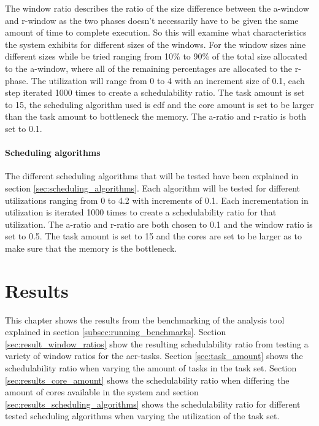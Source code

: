 \documentclass{kththesis}
\begin{document}
The window ratio describes the ratio of the size difference between the \acrshort{a}-window and
\acrshort{r}-window as the two phases doesn't necessarily have to be given the same amount of time
to complete execution. So this will examine what characteristics the system exhibits for different
sizes of the windows. For the window sizes nine different sizes while be tried ranging from 10\% to 90\% of the
total size allocated to the \acrshort{a}-window, where all of the remaining percentages are
allocated to the \acrshort{r}-phase. The utilization will range from 0 to 4 with an increment size
of 0.1, each step iterated 1000 times to create a schedulability ratio. The task amount is set to
15, the scheduling algorithm used is \acrshort{edf} and the core amount is set to be larger than
the task amount to bottleneck the memory. The \acrshort{a}-ratio and \acrshort{r}-ratio is both set
to 0.1.

\subsubsection{Scheduling algorithms}

The different scheduling algorithms that will be tested have been explained in section
\ref{sec:scheduling_algorithms}. Each algorithm will be tested for different utilizations ranging
from 0 to 4.2 with increments of 0.1. Each incrementation in utilization is iterated 1000 times to
create a schedulability ratio for that utilization. The \acrshort{a}-ratio and \acrshort{r}-ratio
are both chosen to 0.1 and the window ratio is set to 0.5. The task amount is set to 15 and the
cores are set to be larger as to make sure that the memory is the bottleneck.


\chapter{Results} \label{ch:result}

This chapter shows the results from the benchmarking of the analysis tool explained in section
\ref{subsec:running_benchmarks}. Section \ref{sec:result_window_ratios} show the resulting
schedulability ratio from testing a variety of window ratios for the \acrshort{aer}-tasks. Section
\ref{sec:task_amount} shows the schedulability ratio when varying the amount of tasks in the task
set. Section \ref{sec:results_core_amount} shows the schedulability ratio when differing the amount of cores
available in the system and section \ref{sec:results_scheduling_algorithms} shows the schedulability
ratio for different tested scheduling algorithms when varying the utilization of the task set.
\end{document}
